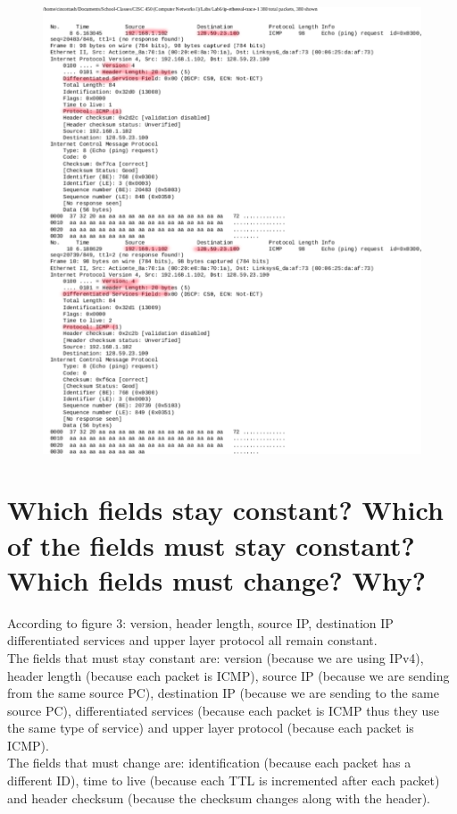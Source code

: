 \documentclass{article}
\begin{document}
\begin{figure}[h!]
\centering
\includegraphics[scale=0.5]{Q6.pdf}
\caption{}
\end{figure}

\section*{Which fields stay constant? Which of the fields must stay constant? Which fields
must change? Why?}
According to figure 3: version, header length, source IP, destination IP differentiated services and upper layer protocol all remain constant.\\
\newline The fields that must stay constant are: version (because we are using IPv4), header length (because each packet is ICMP), source IP (because we are sending from the same source PC), destination IP (because we are sending to the same source PC), differentiated services (because each packet is ICMP thus they use the same type of service) and upper layer protocol (because each packet is ICMP).\\
\newline The fields that must change are: identification (because each packet has a different ID), time to live (because each TTL is incremented after each packet) and header checksum (because the checksum changes along with the header).\\
\end{document}
